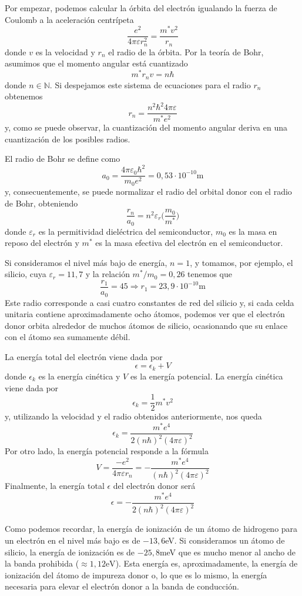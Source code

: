 \documentclass[12pt,a4paper]{article}
\begin{document}
Por empezar, podemos calcular la órbita del electrón igualando la fuerza de Coulomb a la aceleración centrípeta
\[ \frac{e^{2}}{4 \pi \varepsilon r_{n}^{2}} = \frac{m^{\ast}v^{2}}{r_{n}} \]
donde $v$ es la velocidad y $r_{n}$ el radio de la órbita. Por la teoría de Bohr, asumimos que el momento angular está cuantizado
\[ m^{\ast} r_{n} v= n\hbar \]
donde $n \in \mathbb{N}$. Si despejamos este sistema de ecuaciones para el radio $r_{n}$ obtenemos
\[ r_{n} = \frac{n^{2}\hbar^{2}4\pi \varepsilon}{m^{\ast}e^{2}} \]
y, como se puede observar, la cuantización del momento angular deriva en una cuantización de los posibles radios.

El radio de Bohr se define como
\[ a_{0} = \frac{4 \pi \varepsilon _{0} \hbar^{2}}{m_{0}e^{2}} = 0,53 \cdot 10^{-10} \textrm{m} \]
y, consecuentemente, se puede normalizar el radio del orbital donor con el radio de Bohr, obteniendo
\[ \frac{r_{n}}{a_{0}} = n^{2} \varepsilon _{r} \bigg( \frac{m_{0}}{m^{\ast}} \bigg)\]
donde $\varepsilon _{r}$ es la permitividad dieléctrica del semiconductor, $m_{0}$ es la masa en reposo del electrón y $m^{\ast}$ es la masa efectiva del electrón en el semiconductor.

Si consideramos el nivel más bajo de energía, $n=1$, y tomamos, por ejemplo, el silicio, cuya $\varepsilon _{r}=11,7$ y la relación $m^{\ast}/m_{0}=0,26$ tenemos que
\[ \frac{r_{1}}{a_{0}} = 45 \Longrightarrow r_{1}= 23,9 \cdot 10^{-10} \textrm{m} \]
Este radio corresponde a casi cuatro constantes de red del silicio y, si cada celda unitaria contiene aproximadamente ocho átomos, podemos ver que el electrón donor orbita alrededor de muchos átomos de silicio, ocasionando que su enlace con el átomo sea sumamente débil.

La energía total del electrón viene dada por
\[ \epsilon = \epsilon _{k} + V \]
donde $\epsilon _{k}$ es la energía cinética y $V$ es la energía potencial. La energía cinética viene dada por
\[ \epsilon _{k} = \frac{1}{2} m^{\ast} v^{2} \]
y, utilizando la velocidad y el radio obtenidos anteriormente, nos queda
\[ \epsilon _{k} = \frac{m^{\ast} e^{4}}{2(n\hbar)^{2}(4 \pi \varepsilon)^{2}} \]
Por otro lado, la energía potencial responde a la fórmula
\[ V = \frac{-e^{2}}{4 \pi \varepsilon r_{n}} = -\frac{m^{\ast}e^{4}}{(n\hbar)^{2}(4\pi \varepsilon)^{2}} \]
Finalmente, la energía total $\epsilon$ del electrón donor será
\[ \epsilon = -\frac{m^{\ast}e^{4}}{2(n\hbar)^{2}(4\pi \varepsilon)^{2}} \]

Como podemos recordar, la energía de ionización de un átomo de hidrogeno para un electrón en el nivel más bajo es de $-13,6$eV. Si consideramos un átomo de silicio, la energía de ionización es de $-25,8$meV que es mucho menor al ancho de la banda prohibida ($\approx 1,12\textrm{eV}$). Esta energía es, aproximadamente, la energía de ionización del átomo de impureza donor o, lo que es lo mismo, la energía necesaria para elevar el electrón donor a la banda de conducción.
\end{document}

